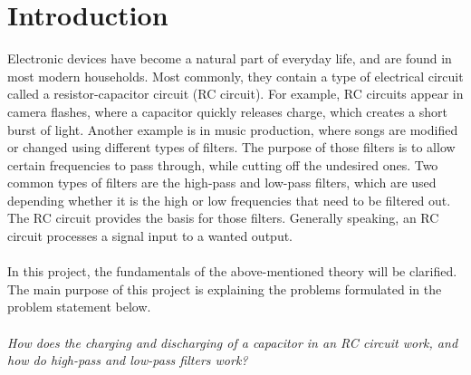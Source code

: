 \chapter{Introduction}
Electronic devices have become a natural part of everyday life, and are found in most modern households. Most commonly, they contain a type of electrical circuit called a resistor-capacitor circuit (RC circuit). For example, RC circuits appear in camera flashes, where a capacitor quickly releases charge, which creates a short burst of light. Another example is in music production, where songs are modified or changed using different types of filters. The purpose of those filters is to allow certain frequencies to pass through, while cutting off the undesired ones. Two common types of filters are the high-pass and low-pass filters, which are used depending whether it is the high or low frequencies that need to be filtered out. The RC circuit provides the basis for those filters. Generally speaking, an RC circuit processes a signal input to a wanted output. 
\\ \\
In this project, the fundamentals of the above-mentioned theory will be clarified. The main purpose of this project is explaining the problems formulated in the problem statement below.
\\ \\
\textit{How does the charging and discharging of a capacitor in an RC circuit work, and how do high-pass and low-pass filters work?}


